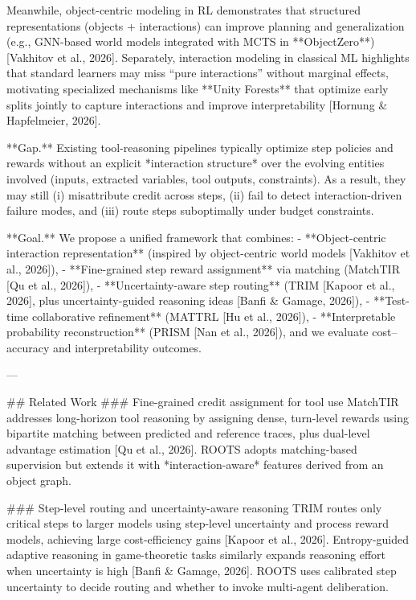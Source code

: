Meanwhile, object-centric modeling in RL demonstrates that structured representations (objects + interactions) can improve planning and generalization (e.g., GNN-based world models integrated with MCTS in **ObjectZero**) [Vakhitov et al., 2026]. Separately, interaction modeling in classical ML highlights that standard learners may miss “pure interactions” without marginal effects, motivating specialized mechanisms like **Unity Forests** that optimize early splits jointly to capture interactions and improve interpretability [Hornung & Hapfelmeier, 2026].

**Gap.** Existing tool-reasoning pipelines typically optimize step policies and rewards without an explicit *interaction structure* over the evolving entities involved (inputs, extracted variables, tool outputs, constraints). As a result, they may still (i) misattribute credit across steps, (ii) fail to detect interaction-driven failure modes, and (iii) route steps suboptimally under budget constraints.

**Goal.** We propose a unified framework that combines:
- **Object-centric interaction representation** (inspired by object-centric world models [Vakhitov et al., 2026]),
- **Fine-grained step reward assignment** via matching (MatchTIR [Qu et al., 2026]),
- **Uncertainty-aware step routing** (TRIM [Kapoor et al., 2026], plus uncertainty-guided reasoning ideas [Banfi & Gamage, 2026]),
- **Test-time collaborative refinement** (MATTRL [Hu et al., 2026]),
- **Interpretable probability reconstruction** (PRISM [Nan et al., 2026]),
and we evaluate cost–accuracy and interpretability outcomes.

---

## Related Work
### Fine-grained credit assignment for tool use
MatchTIR addresses long-horizon tool reasoning by assigning dense, turn-level rewards using bipartite matching between predicted and reference traces, plus dual-level advantage estimation [Qu et al., 2026]. ROOTS adopts matching-based supervision but extends it with *interaction-aware* features derived from an object graph.

### Step-level routing and uncertainty-aware reasoning
TRIM routes only critical steps to larger models using step-level uncertainty and process reward models, achieving large cost-efficiency gains [Kapoor et al., 2026]. Entropy-guided adaptive reasoning in game-theoretic tasks similarly expands reasoning effort when uncertainty is high [Banfi & Gamage, 2026]. ROOTS uses calibrated step uncertainty to decide routing and whether to invoke multi-agent deliberation.

